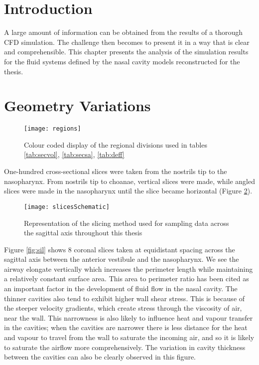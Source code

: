\section{Introduction}
A large amount of information can be obtained from the results of a thorough CFD simulation. The challenge then becomes to present it in a way that is clear and comprehensible.
This chapter presents the analysis of the simulation results for the fluid systems defined by the nasal cavity models reconstructed for the thesis.

\section{Geometry Variations}


\begin{figure}
\centering
\texttt{[image: regions]}
\caption{Colour coded display of the regional divisions used in tables \ref{tab:secvol}, \ref{tab:secsa}, \ref{tab:deff}} 
\label{fig:regions}
\end{figure} 

One-hundred cross-sectional slices were taken from the nostrils tip to the nasopharynx. From nostrils tip to choanae, vertical slices were made, while angled slices were made in the nasopharynx until the slice became horizontal (Figure \ref{fig:Slices}).


\begin{figure} 
\centering
\texttt{[image: slicesSchematic]}
\caption{Representation of the slicing method used for sampling data across the sagittal axis throughout this thesis} 
\label{fig:Slices}
\end{figure}

Figure \ref{fig:sil} shows 8 coronal slices taken at equidistant spacing across the sagittal axis between the anterior vestibule and the nasopharynx. We see the airway elongate vertically which increases the perimeter length while maintaining a relatively constant surface area. This area to perimeter ratio has been cited as an important factor in the development of fluid flow in the nasal cavity. The thinner cavities also tend to exhibit higher wall shear stress. This is because of the steeper velocity gradients, which create stress through the viscosity of air, near the wall. This narrowness is also likely to influence heat and vapour transfer in the cavities; when the cavities are narrower there is less distance for the heat and vapour to travel from the wall to saturate the incoming air, and so it is likely to saturate the airflow more comprehensively. The variation in cavity thickness between the cavities can also be clearly observed in this figure.


